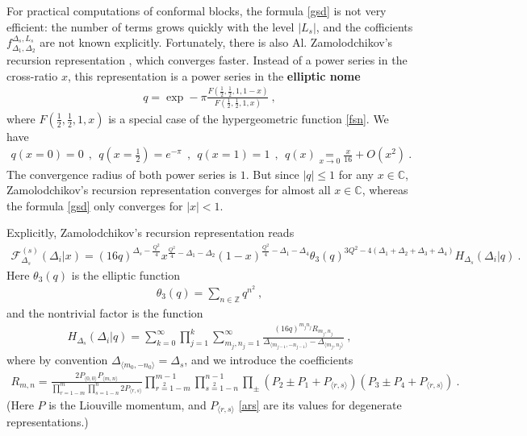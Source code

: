 \documentclass[12pt, a4paper, notitlepage, twoside]{report}
\numberwithin{equation}{section}
\theoremstyle{break}
\begin{document}
For practical computations of conformal blocks, the formula \eqref{gsd} is not very efficient: the number of terms grows quickly with the level $|L_s|$, and the cofficients $f_{\Delta_1,\Delta_2}^{\Delta_s,L_s}$ are not known explicitly.
Fortunately, there is also Al.
Zamolodchikov's recursion representation \cite{zz90}, which converges faster.
Instead of a power series in the cross-ratio $x$, this representation is a power series in the \textbf{elliptic nome}
\begin{align}
 q = \exp -\pi \frac{F(\frac12,\frac12,1,1-x)}{F(\frac12,\frac12,1,x)}  \ , 
\end{align}
where $F(\frac12,\frac12,1,x)$ is a special case of the hypergeometric function \eqref{fsn}. 
We have 
\begin{align}
 q(x=0)=0 \ \ , \ \ q(x=\tfrac12) = e^{-\pi} \ \ , \ \ q(x=1)=1 \ \ , \ \ q(x)\underset{x\to 0}{=} \frac{x}{16} +O(x^2)\ .
\end{align}
The convergence radius of both power series is $1$.
But since $|q|\leq 1$ for any $x\in\mathbb{C}$, Zamolodchikov's recursion representation converges for almost all $x\in \mathbb{C}$, whereas the formula \eqref{gsd} only converges for $|x|<1$.

Explicitly, Zamolodchikov's recursion representation reads 
\begin{align}
 \mathcal{F}^{(s)}_{\Delta_s}(\Delta_i|x) 
=  (16q)^{\Delta_s -\frac{Q^2}{4}} x^{\frac{Q^2}{4}-\Delta_1-\Delta_2} (1-x)^{\frac{Q^2}{4}-\Delta_1-\Delta_4} \theta_3(q)^{3Q^2-4(\Delta_1+\Delta_2+\Delta_3+\Delta_4)} H_{\Delta_s}(\Delta_i|q)\ .
\end{align}
Here $\theta_3(q)$ is the elliptic function
\begin{align}
 \theta_3(q) = \sum_{n\in{\mathbb{Z}}} q^{n^2}\ ,
\end{align}
 and the nontrivial factor is the function
\begin{align}
 H_{\Delta_s}(\Delta_i|q) = \sum_{k=0}^\infty \prod_{j=1}^k \sum_{m_j,n_j=1}^\infty \frac{(16q)^{m_jn_j}R_{m_j,n_j}}{\Delta_{\langle m_{j-1},-n_{j-1} \rangle}-\Delta_{\langle m_j,n_j\rangle}}\ ,
\label{hdq}
\end{align}
where by convention $\Delta_{\langle m_0,-n_0\rangle} = \Delta_s$, and we introduce the coefficients
\begin{align}
 R_{m,n} = \frac{2P_{\langle 0,0\rangle} P_{\langle m,n\rangle}}{\prod_{r=1-m}^m \prod_{s=1-n}^n 2P_{\langle r,s\rangle}}
\prod_{r\overset{2}{=}1-m}^{m-1} \prod_{s\overset{2}{=}1-n}^{n-1} \prod_\pm (P_2\pm P_1 + P_{\langle r,s\rangle}) (P_3\pm P_4 +P_{\langle r,s\rangle})\ .
\end{align}
(Here $P$ is the Liouville momentum, and $P_{\langle r,s \rangle}$ \eqref{ars} are its values for degenerate representations.)
\end{document}
